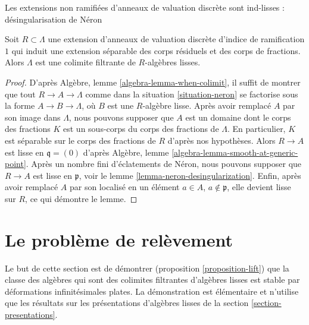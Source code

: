 \begin{lemma}
\label{lemma-neron-colimit}
\begin{slogan}
Les extensions non ramifiées d'anneaux de valuation discrète sont ind-lisses : désingularisation de Néron
\end{slogan}
Soit $R \subset \Lambda$ une extension d'anneaux de valuation
discrète d'indice de ramification $1$ qui induit une extension séparable
des corps résiduels et des corps de fractions.
Alors $\Lambda$ est une colimite filtrante de $R$-algèbres lisses.
\end{lemma}

\begin{proof}
D'après Algèbre, lemme \ref{algebra-lemma-when-colimit}, il suffit de montrer
que tout $R \to A \to \Lambda$ comme dans la situation \ref{situation-neron}
se factorise sous la forme $A \to B \to \Lambda$, où $B$ est une
$R$-algèbre lisse. Après avoir remplacé $A$ par son image dans $\Lambda$,
nous pouvons supposer que $A$ est un domaine dont le corps des fractions $K$
est un sous-corps du corps des fractions de $\Lambda$.
En particulier, $K$ est séparable sur le corps des fractions de $R$
d'après nos hypothèses. Alors $R \to A$ est lisse en $\mathfrak q = (0)$ d'après
Algèbre, lemme \ref{algebra-lemma-smooth-at-generic-point}.
Après un nombre fini d'éclatements de Néron, nous pouvons supposer que $R \to A$
est lisse en $\mathfrak p$, voir le lemme \ref{lemma-neron-desingularization}.
Enfin, après avoir remplacé $A$ par son localisé
en un élément $a \in A$, $a \not \in \mathfrak p$, elle devient
lisse sur $R$, ce qui démontre le lemme.
\end{proof}












\section{Le problème de relèvement}
\label{section-lifting}

\noindent
Le but de cette section est de démontrer (proposition \ref{proposition-lift})
que la classe des algèbres qui sont des colimites filtrantes d'algèbres lisses
est stable par déformations infinitésimales plates. La démonstration est élémentaire
et n'utilise que les résultats sur les présentations d'algèbres lisses de la
section \ref{section-presentations}.

